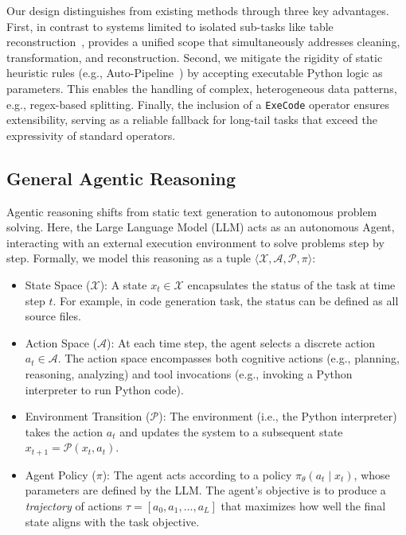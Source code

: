 Our design distinguishes \sys from existing methods through three key advantages. 
First, in contrast to systems limited to isolated sub-tasks like table reconstruction~\cite{DBLP:journals/pvldb/LiHYWC23}, \sys provides a {unified scope} that simultaneously addresses cleaning, transformation, and reconstruction. 
Second, we mitigate the rigidity of static heuristic rules (e.g., Auto-Pipeline~\cite{yang2021auto}) by accepting executable Python logic as parameters. This enables the handling of complex, heterogeneous data patterns, e.g., regex-based splitting. 
Finally, the inclusion of a \texttt{ExeCode} operator ensures {extensibility}, serving as a reliable fallback for long-tail tasks that exceed the expressivity of standard operators.



\subsection{General Agentic Reasoning}
\label{subsec:agentic_reasoning_preliminary}

Agentic reasoning shifts from static text generation to autonomous problem solving. Here, the Large Language Model (LLM) acts as an autonomous {Agent}, interacting with an external execution environment to solve problems step by step. Formally, we model this reasoning as a tuple $\langle \mathcal{X}, \mathcal{A}, \mathcal{P}, \pi \rangle$:

\begin{itemize}[leftmargin=1em]
    \item {State Space ($\mathcal{X}$):} A state $x_t \in \mathcal{X}$ encapsulates the status of the task at time step $t$. For example, in code generation task, the status can be defined as all source files.
    
    \item {Action Space ($\mathcal{A}$):} At each time step, the agent selects a discrete action $a_t \in \mathcal{A}$. The action space encompasses both {cognitive actions} (e.g., planning, reasoning, analyzing) and {tool invocations} (e.g., invoking a Python interpreter to run Python code).
    
    \item {Environment Transition ($\mathcal{P}$):} The environment (i.e., the Python interpreter) takes the action $a_t$ and updates the system to a subsequent state $x_{t+1} = \mathcal{P}(x_t, a_t)$.
    
    \item {Agent Policy ($\pi$):} The agent acts according to a policy $\pi_\theta(a_t \mid x_t)$, whose parameters are defined by the LLM. The agent’s objective is to produce a \textit{trajectory} of actions $\tau = [a_0, a_1, \dots, a_L]$ that maximizes how well the final state aligns with the task objective.
\end{itemize}

